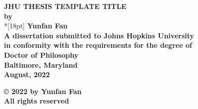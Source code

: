 \documentclass[12pt]{report}
\begin{document}
\newcommand{\bm}[1]{ \mbox{\boldmath $ #1 $} }
\newcommand{\bin}[2]{\left(\begin{array}{@{}c@{}} #1 \\ #2
             \end{array}\right) }
\renewcommand{\contentsname}{Table of Contents}
\baselineskip=24pt

\thispagestyle{empty}
\begin{center}
\vspace*{.25in}
{\bf\LARGE{ JHU THESIS TEMPLATE TITLE }}\\
\vspace*{.75in}
{\bf by} \\*[18pt]
\vspace*{.2in}
{\bf Yunfan Fan} \\
\vspace*{1in}
{\bf A dissertation submitted to Johns Hopkins University\\
in conformity with the requirements for the degree of\\
Doctor of Philosophy }\\
\vspace*{.75in}
{\bf Baltimore, Maryland} \\
{\bf August, 2022} \\
\vspace*{.5in}
\begin{small}
{\bf \copyright{ }2022 by Yunfan Fan} \\
{\bf All rights reserved}
\end{small}
\end{center}
\newpage

\pagestyle{plain}
\setcounter{page}{2}




\pagestyle{plain}
\baselineskip=24pt
\tableofcontents
\listoftables
\listoffigures

\cleardoublepage %
\end{document}
